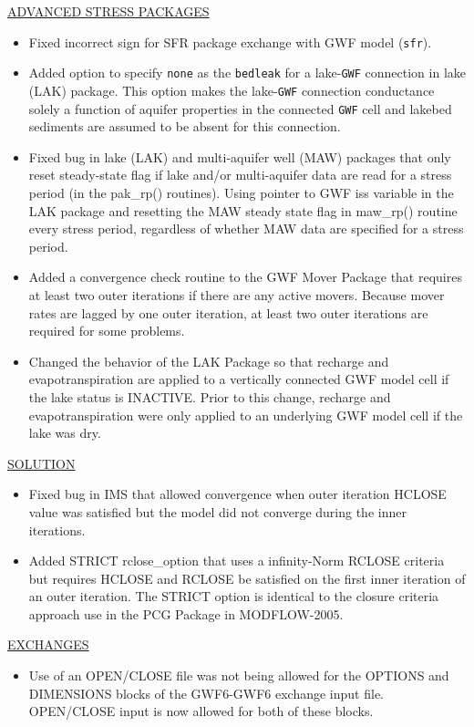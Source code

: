 	\underline{ADVANCED STRESS PACKAGES}
	\begin{itemize}
		\item Fixed incorrect sign for SFR package exchange with GWF model (\texttt{sfr}).
		\item Added option to specify \texttt{none} as the \texttt{bedleak} for a lake-\texttt{GWF} connection in lake (LAK) package. This option makes the lake-\texttt{GWF} connection conductance solely a function of aquifer properties in the connected \texttt{GWF} cell and lakebed sediments are assumed to be absent for this connection.
		\item Fixed bug in lake (LAK) and multi-aquifer well (MAW) packages that only reset steady-state flag if lake and/or multi-aquifer data are read for a stress period (in the pak\_rp() routines). Using pointer to GWF iss variable in the LAK package and resetting the MAW steady state flag in maw\_rp() routine every stress period, regardless of whether MAW data are specified for a stress period.
		\item Added a convergence check routine to the GWF Mover Package that requires at least two outer iterations if there are any active movers.  Because mover rates are lagged by one outer iteration, at least two outer iterations are required for some problems.
		\item Changed the behavior of the LAK Package so that recharge and evapotranspiration are applied to a vertically connected GWF model cell if the lake status is INACTIVE.  Prior to this change, recharge and evapotranspiration were only applied to an underlying GWF model cell if the lake was dry.
	\end{itemize}
	
	\underline{SOLUTION}
	\begin{itemize}
		\item Fixed bug in IMS that allowed convergence when outer iteration HCLOSE value was satisfied but the model did not converge during the inner iterations.
		\item Added STRICT rclose\_option that uses a infinity-Norm RCLOSE criteria but requires HCLOSE and RCLOSE be satisfied on the first inner iteration of an outer iteration. The STRICT option is identical to the closure criteria approach use in the PCG Package in MODFLOW-2005.
	\end{itemize}
	
	\underline{EXCHANGES}
	\begin{itemize}
		\item Use of an OPEN/CLOSE file was not being allowed for the OPTIONS and DIMENSIONS blocks of the GWF6-GWF6 exchange input file.  OPEN/CLOSE input is now allowed for both of these blocks.
	\end{itemize}

